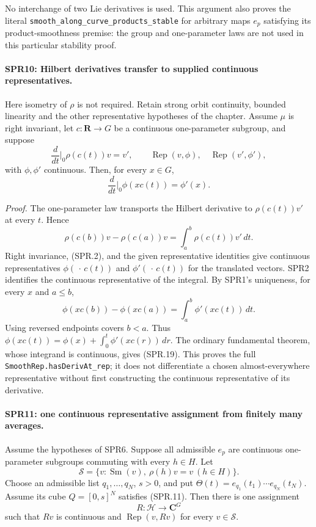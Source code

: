 \documentclass[11pt,a4paper]{article}
\numberwithin{equation}{section}
\theoremstyle{remark}\newtheorem{remark}[theorem]{Remark}
\begin{document}
No interchange of two Lie derivatives is used.  This argument
also proves the literal
\texttt{smooth\_\allowbreak along\_\allowbreak curve\_\allowbreak products\_\allowbreak stable} for arbitrary maps
\(e_p\) satisfying its product-smoothness premise: the group and
one-parameter laws are not used in this particular stability proof.

\paragraph{SPR10: Hilbert derivatives transfer to supplied continuous representatives.}
\label{claim:SPR10}
Here isometry of \(\rho\) is not required.  Retain strong
orbit continuity, bounded linearity and the other representative
hypotheses of the chapter.
Assume \(\mu\) is right invariant, let \(c:\mathbf R\to G\)
be a continuous one-parameter subgroup, and suppose
\[
 \frac{d}{dt}\bigg|_{0}\rho(c(t))v=v',\qquad
 \operatorname{Rep}(v,\phi),\quad
 \operatorname{Rep}(v',\phi'),
\]
with \(\phi,\phi'\) continuous.
Then, for every \(x\in G\),
\[
          \frac{d}{dt}\bigg|_0\phi(xc(t))=\phi'(x).
 \tag{SPR.19}
\]

\emph{Proof.}
The one-parameter law transports the Hilbert derivative to
\(\rho(c(t))v'\) at every \(t\).  Hence
\[
 \rho(c(b))v-\rho(c(a))v
                  =\int_a^b\rho(c(t))v'\,dt.
\]
Right invariance, (SPR.2), and the given representative identities
give continuous representatives \(\phi(\,\cdot\,c(t))\) and
\(\phi'(\,\cdot\,c(t))\) for the translated vectors.
SPR2 identifies the continuous representative of the integral.
By SPR1's uniqueness, for every \(x\) and \(a\le b\),
\[
 \phi(xc(b))-\phi(xc(a))
                    =\int_a^b\phi'(xc(t))\,dt.
 \tag{SPR.20}
\]
Using reversed endpoints covers \(b<a\).
Thus
\(\phi(xc(t))=\phi(x)+\int_0^t\phi'(xc(r))\,dr\).
The ordinary fundamental theorem, whose integrand is continuous,
gives (SPR.19).  This proves the full
\texttt{SmoothRep.\allowbreak hasDerivAt\_\allowbreak rep}; it does not differentiate a
chosen almost-everywhere representative without first constructing
the continuous representative of its derivative.

\paragraph{SPR11: one continuous representative assignment from finitely many averages.}
\label{claim:SPR11}
Assume the hypotheses of SPR6.  Suppose all admissible \(e_p\)
are continuous one-parameter subgroups commuting with every
\(h\in H\).  Let
\[
 \mathcal S=\{v:\operatorname{Sm}(v),\ \rho(h)v=v\ (h\in H)\}.
\]
Choose an admissible list \(q_1,\ldots,q_N\), \(s>0\), and put
\(\Theta(t)=e_{q_1}(t_1)\cdots e_{q_N}(t_N)\).
Assume its cube \(Q=[0,s]^N\) satisfies (SPR.11).
Then there is one assignment
\[
                     R:\mathcal H\longrightarrow\mathbf C^G
\]
such that \(Rv\) is continuous and
\(\operatorname{Rep}(v,Rv)\) for every \(v\in\mathcal S\).
\end{document}
